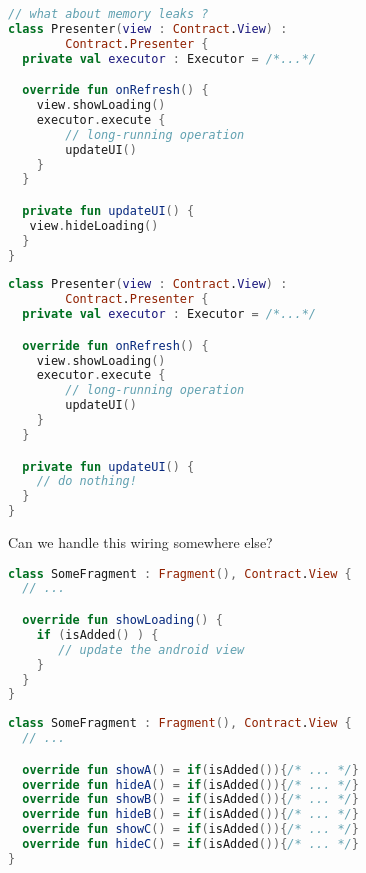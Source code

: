 \documentclass[10pt]{beamer}
\begin{document}
\begin{frame}[fragile]
\begin{lstlisting}[language=Kotlin, basicstyle=\ttfamily]
// what about memory leaks ?
class Presenter(view : Contract.View) : 
        Contract.Presenter {
  private val executor : Executor = /*...*/

  override fun onRefresh() {
    view.showLoading()  
    executor.execute {
        // long-running operation
        updateUI()
    } 
  }

  private fun updateUI() {
   view.hideLoading()  
  }
}
\end{lstlisting}
\end{frame}
\begin{frame}[fragile]
\begin{lstlisting}[language=Kotlin, basicstyle=\ttfamily]
class Presenter(view : Contract.View) : 
        Contract.Presenter {
  private val executor : Executor = /*...*/

  override fun onRefresh() {
    view.showLoading()  
    executor.execute {
        // long-running operation
        updateUI()
    } 
  }

  private fun updateUI() {
    // do nothing!
  }
}
\end{lstlisting}
\end{frame}


\begin{frame}[fragile]
Can we handle this wiring somewhere else?
\end{frame}


\begin{frame}[fragile]
\begin{lstlisting}[language=Kotlin, basicstyle=\ttfamily]
class SomeFragment : Fragment(), Contract.View {
  // ...

  override fun showLoading() {
    if (isAdded() ) {
       // update the android view 
    }
  }
}
\end{lstlisting}
\end{frame}

\begin{frame}[fragile]
\begin{lstlisting}[language=Kotlin, basicstyle=\ttfamily]
class SomeFragment : Fragment(), Contract.View {
  // ...

  override fun showA() = if(isAdded()){/* ... */}
  override fun hideA() = if(isAdded()){/* ... */}
  override fun showB() = if(isAdded()){/* ... */}
  override fun hideB() = if(isAdded()){/* ... */}
  override fun showC() = if(isAdded()){/* ... */}
  override fun hideC() = if(isAdded()){/* ... */}
}
\end{lstlisting}
\end{frame}
\end{document}
